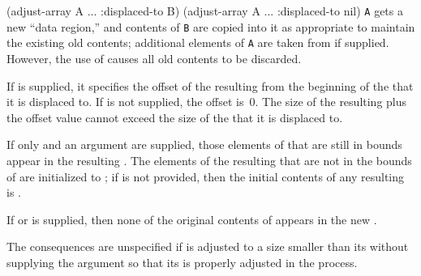 \code
 (adjust-array A ... :displaced-to B)
 (adjust-array A ... :displaced-to nil)
\endcode
{\tt A} gets a
new ``data region,'' and contents of {\tt B} are copied into it as appropriate to
maintain the existing old contents; additional elements of {\tt A} 
are taken from
 if supplied.  However, 
the use of  causes all old contents
to be discarded.
\endlist
{}
                      
If  is supplied,
it specifies the offset
of the resulting  from the beginning of 
the  that it is displaced to.           
If  is not supplied, the offset is~0.  
The size of the resulting  plus the 
offset value cannot exceed the size of
the  that it is displaced to.

If only 
and an  argument are supplied,
those elements of  that
are still in bounds appear in the resulting . The elements of
the resulting  that are not in the bounds of 
 are initialized
to ; if  is not provided,
then the initial contents of any resulting 
is .

If  or  is supplied,
then none of the original contents of  appears in the new .


%

The consequences are unspecified if  is adjusted 
to a size smaller than its  without supplying
the  argument so that its 
is properly adjusted in the process.

